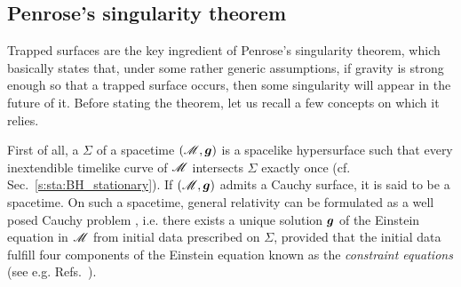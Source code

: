 \subsection{Penrose's singularity theorem}

Trapped surfaces are the key ingredient of Penrose's singularity theorem,
which basically states that, under some rather generic assumptions, if gravity is
strong enough so that a trapped surface occurs, then some singularity will
appear in the future of it.
Before stating the theorem, let us recall a few concepts on which it relies.

First of all, a 
$\Sigma$ of a spacetime $(\mathscr{M},\bm{g})$ is a spacelike
hypersurface such that every inextendible timelike curve of $\mathscr{M}$
intersects $\Sigma$ exactly once (cf. Sec.~\ref{s:sta:BH_stationary}). If $(\mathscr{M},\bm{g})$
admits a Cauchy surface, it is said to be a
 spacetime.
On such a spacetime, general relativity can be formulated as a well posed
Cauchy problem \cite{ChoquG69},
i.e. there exists a unique solution $\bm{g}$ of the Einstein equation
in $\mathscr{M}$ from initial data prescribed on $\Sigma$, provided that the initial data
fulfill four components of the Einstein equation known as the
\emph{constraint equations}
(see e.g. Refs.~\cite{Choqu09,Gourg12}).

